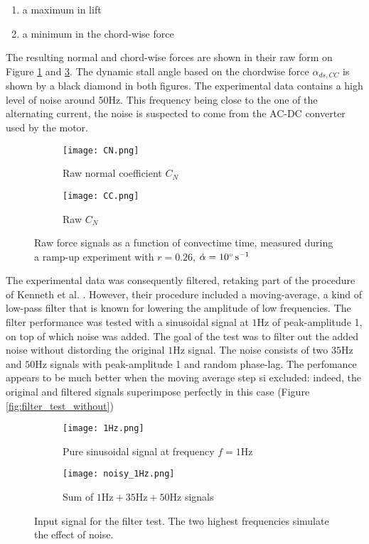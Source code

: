 \begin{enumerate}
	\item a maximum in lift
	\item a minimum in the chord-wise force
\end{enumerate} 

The resulting normal and chord-wise forces are shown in their raw form on Figure \ref{fig:CN_ramp_example} and \ref{fig:CC_ramp_example}. The dynamic stall angle based on the chordwise force $\alpha_{ds,CC}$ is shown by a black diamond in both figures. The experimental data contains a high level of noise around 50Hz. This frequency being close to the one of the alternating current, the noise is suspected to come from the AC-DC converter used by the motor. 

\begin{figure}[h]
	\begin{subfigure}{.5\textwidth}
		\texttt{[image: CN.png]}
		\caption{Raw normal coefficient $C_N$}
		\label{fig:CN_ramp_example}
	\end{subfigure}%
	\begin{subfigure}{.5\textwidth}
		\texttt{[image: CC.png]}
		\caption{Raw $C_N$}
		\label{fig:CC_ramp_example}
	\end{subfigure}
	\caption{Raw force signals as a function of convectime time, measured during a ramp-up experiment with $r=0.26$, $\dot{\alpha} = 10 \si{\degree \per \second}$}
\end{figure}

The experimental data was consequently filtered, retaking part of the procedure of Kenneth et al. \cite{kenneth_experiments_2011}. However, their procedure included a moving-average, a kind of low-pass filter that is known for lowering the amplitude of low frequencies. 
The filter performance was tested with a sinusoidal signal at $1 \si{\hertz}$ of peak-amplitude 1, on top of which noise was added. The goal of the test was to filter out the added noise without distording the original $1 \si{\hertz}$ signal. 
The noise consists of two $35 \si{\hertz}$ and $50 \si{\hertz}$ signals with peak-amplitude 1 and random phase-lag. The perfomance appears to be much better when the moving average step si excluded: indeed, the original and filtered signals superimpose perfectly in this case (Figure \ref{fig:filter_test_without})

\begin{figure}[h]
	\begin{subfigure}{.5\textwidth}
		\texttt{[image: 1Hz.png]}
		\caption{Pure sinusoidal signal at frequency $f=1 \si{\hertz}$}
		\label{fig:1Hz}
	\end{subfigure}%
	\begin{subfigure}{.5\textwidth}
		\texttt{[image: noisy\_1Hz.png]}
		\caption{Sum of $1\si{\hertz} + 35\si{\hertz} + 50\si{\hertz}$ signals}
		\label{fig:noisy_1Hz}
	\end{subfigure}
	\caption{Input signal for the filter test. The two highest frequencies simulate the effect of noise.}
\end{figure}

